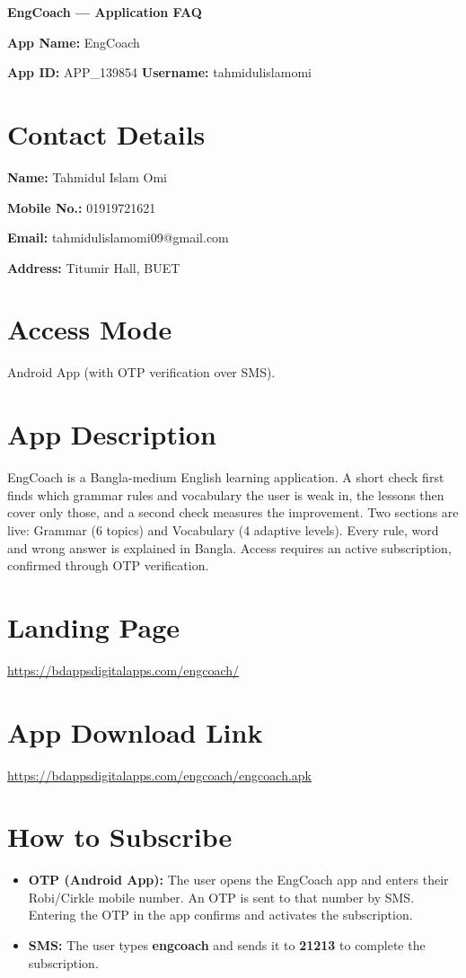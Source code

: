 \documentclass[11pt,a4paper]{article}
\newcommand{\field}[2]{\textbf{#1:} #2}
\begin{document}
{\LARGE\bfseries\color{navy} EngCoach — Application FAQ}\par
\vspace{10pt}

\field{App Name}{EngCoach}\par
\field{App ID}{APP\_139854 \hspace{2em} \textbf{Username:} tahmidulislamomi}

\section{Contact Details}
\field{Name}{Tahmidul Islam Omi}\par
\field{Mobile No.}{01919721621}\par
\field{Email}{tahmidulislamomi09@gmail.com}\par
\field{Address}{Titumir Hall, BUET}

\section{Access Mode}
Android App (with OTP verification over SMS).

\section{App Description}
EngCoach is a Bangla-medium English learning application. A short check first finds
which grammar rules and vocabulary the user is weak in, the lessons then cover only
those, and a second check measures the improvement. Two sections are live: Grammar
(6 topics) and Vocabulary (4 adaptive levels). Every rule, word and wrong answer is
explained in Bangla. Access requires an active subscription, confirmed through OTP
verification.

\section{Landing Page}
\url{https://bdappsdigitalapps.com/engcoach/}

\section{App Download Link}
\url{https://bdappsdigitalapps.com/engcoach/engcoach.apk}

\section{How to Subscribe}
\begin{itemize}
  \item \textbf{OTP (Android App):} The user opens the EngCoach app and enters their
        Robi/Cirkle mobile number. An OTP is sent to that number by SMS. Entering the
        OTP in the app confirms and activates the subscription.
  \item \textbf{SMS:} The user types \textbf{engcoach} and sends it to
        \textbf{21213} to complete the subscription.
\end{itemize}
\end{document}
